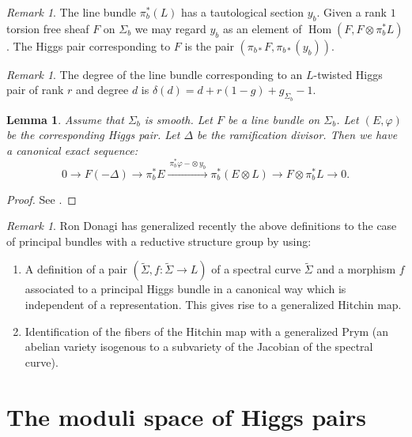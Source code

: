 \documentclass[12pt,a4paper,oneside,english]{smfart}
\newtheorem{lem}[thm]{Lemma}
\theoremstyle{definition}
\theoremstyle{remark}
\newtheorem{rem}[thm]{Remark}
\DeclareMathOperator{\Hom}{Hom}
\begin{document}
\begin{rem}\label{t2.5}
The line bundle $\pi_b^*(L)$ has a tautological section $y_b$. Given a rank $1$ torsion free sheaf $F$ on $\Sigma_b$ we may regard $y_b$ as an element of $\Hom(F, F \otimes \pi_b^* L)$. The Higgs pair corresponding to $F$ is the pair $(\pi_{b*}F, \pi_{b*}(y_b))$.
\end{rem}

\begin{rem}\label{t2.6}
The degree of the line bundle corresponding to an $L$-twisted Higgs pair of rank $r$ and degree $d$ is $\delta(d) = d + r(1-g) + g_{\Sigma_b} - 1$.
\end{rem}

\begin{lem}\label{t2.7}
Assume that $\Sigma_b$ is smooth. Let $F$ be a line bundle on $\Sigma_b$. Let $(E, \varphi)$ be the corresponding Higgs pair. Let $\Delta$ be the ramification divisor. Then we have a canonical exact sequence:
\begin{equation}\label{eq1}
0 \to F(-\Delta) \to \pi_b^* E \xrightarrow{\ \pi_b^*\varphi - \otimes\, y_b\ } \pi_b^*(E \otimes L) \to F \otimes \pi_b^* L \to 0.
\end{equation}
\end{lem}

\begin{proof}
See \cite{B-N-R}.
\end{proof}

\begin{rem}\label{t2.8}
Ron Donagi has generalized recently the above definitions to the case of principal bundles with a reductive structure group by using:
\begin{enumerate}
    \item A definition of a pair $(\tilde{\Sigma}, f \colon \tilde{\Sigma} \to L)$ of a spectral curve $\tilde{\Sigma}$ and a morphism $f$ associated to a principal Higgs bundle in a canonical way which is independent of a representation. This gives rise to a generalized Hitchin map.
    \item Identification of the fibers of the Hitchin map with a generalized Prym (an abelian variety isogenous to a subvariety of the Jacobian of the spectral curve).
\end{enumerate}
\end{rem}

\section{The moduli space of Higgs pairs}\label{sec:3}
\end{document}
